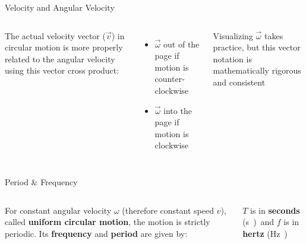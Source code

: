 \documentclass[12pt,compress,aspectratio=169]{beamer}
\begin{document}
\begin{frame}{Velocity and Angular Velocity}
  \begin{columns}[T]
    

    The actual velocity vector ($\vec v$) in circular motion is more properly
    related to the angular velocity using this vector cross product:

    \begin{itemize}
    \item\vspace{-.2in}$\vec\omega$ out of the page if motion is
      counter-clockwise
    \item $\vec\omega$ into the page if motion is clockwise
    \end{itemize}
    Visualizing $\vec\omega$ takes practice, but this vector notation is
    mathematically rigorous and consistent
  \end{columns}
\end{frame}



%
%
%  




\begin{frame}{Period \& Frequency}
  \begin{columns}[T]
    

    For constant angular velocity $\omega$ (therefore constant speed $v$),
    called \textbf{uniform circular motion}, the motion is strictly periodic.
    Its \textbf{frequency} and \textbf{period} are given by:

    
    $T$ is in \textbf{seconds} (\si\second) and $f$ is in \textbf{hertz}
    (\si\hertz)

  \end{columns}
\end{frame}
\end{document}
